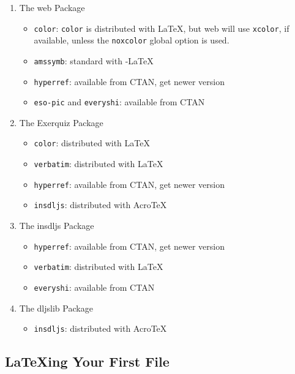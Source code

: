 \documentclass{article}
\def\AcroT{Acro\!\TeX}\def\cAcroT{\textcolor{blue}{\AcroT}}
\def\Web{\textsf{web}}
\let\pkg\textsf
\def\AmS{{\protect\usefont{OMS}{cmsy}{m}{n}%
  A\kern-.1667em\lower.5ex\hbox{M}\kern-.125emS}}
\def\amslatex/{{\protect\AmS-\protect\LaTeX}}
\begin{document}
{\begin{enumerate}
    \item The \pkg{web} Package
        \begin{itemize}
            \item \texttt{color}: \texttt{color} is distributed with \LaTeX, but {\Web}
            will use \texttt{xcolor}, if available, unless the
            \texttt{noxcolor} global option is used.
            \item \texttt{amssymb}: standard with \amslatex/
            \item \texttt{hyperref}: available from CTAN, get newer version
            \item \texttt{eso-pic} and \texttt{everyshi}: available from CTAN
        \end{itemize}
    \item The \textsf{Exerquiz} Package
        \begin{itemize}
            \item \texttt{color}: distributed with \LaTeX
            \item \texttt{verbatim}: distributed with \LaTeX
            \item \texttt{hyperref}: available from CTAN, get newer version
            \item \texttt{insdljs}: distributed with \AcroT
        \end{itemize}
    \item The \textsf{insdljs} Package
        \begin{itemize}
            \item \texttt{hyperref}: available from CTAN, get newer version
            \item \texttt{verbatim}: distributed with \LaTeX
            \item \texttt{everyshi}: available from CTAN
        \end{itemize}
    \item The \textsf{dljslib} Package
        \begin{itemize}
            \item \texttt{insdljs}: distributed with \AcroT
        \end{itemize}
\end{enumerate}

\subsection{\LaTeX ing Your First File}

}
\end{document}
